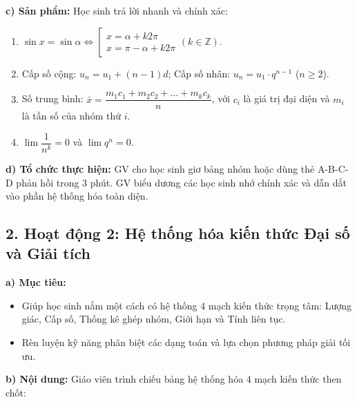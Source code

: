 \documentclass[12pt, a4paper]{article}
\begin{document}
\noindent \textbf{c) Sản phẩm:}
Học sinh trả lời nhanh và chính xác:
\begin{enumerate}
    \item $\sin x = \sin \alpha \iff \left[\begin{array}{l} x = \alpha + k2\pi \\ x = \pi - \alpha + k2\pi \end{array}\right. (k \in \mathbb{Z})$.
    \item Cấp số cộng: $u_n = u_1 + (n-1)d$; Cấp số nhân: $u_n = u_1 \cdot q^{n-1}$ ($n \ge 2$).
    \item Số trung bình: $\bar{x} = \dfrac{m_1 c_1 + m_2 c_2 + \dots + m_k c_k}{n}$, với $c_i$ là giá trị đại diện và $m_i$ là tần số của nhóm thứ $i$.
    \item $\lim \dfrac{1}{n^k} = 0$ và $\lim q^n = 0$.
\end{enumerate}

\noindent \textbf{d) Tổ chức thực hiện:}
GV cho học sinh giơ bảng nhóm hoặc dùng thẻ A-B-C-D phản hồi trong 3 phút. GV biểu dương các học sinh nhớ chính xác và dẫn dắt vào phần hệ thống hóa toàn diện.

\subsection*{2. Hoạt động 2: Hệ thống hóa kiến thức Đại số và Giải tích}

\noindent \textbf{a) Mục tiêu:}
\begin{itemize}
    \item Giúp học sinh nắm một cách có hệ thống 4 mạch kiến thức trọng tâm: Lượng giác, Cấp số, Thống kê ghép nhóm, Giới hạn và Tính liên tục.
    \item Rèn luyện kỹ năng phân biệt các dạng toán và lựa chọn phương pháp giải tối ưu.
\end{itemize}

\noindent \textbf{b) Nội dung:}
Giáo viên trình chiếu bảng hệ thống hóa 4 mạch kiến thức then chốt:
\end{document}
